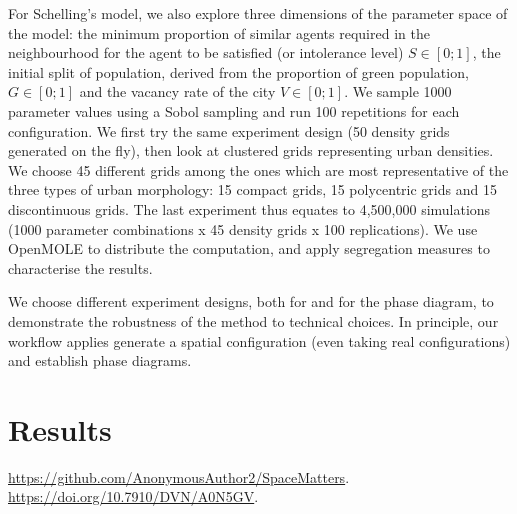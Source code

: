 \documentclass[preprint,5p,times,twocolumn,authoryear]{elsarticle}
\begin{document}
For Schelling's model, we also explore three dimensions of the parameter space of the model: the minimum proportion of similar agents required in the neighbourhood for the agent to be satisfied (or intolerance level) $S\in \left[0;1\right]$, the initial split of population, derived from the proportion of green population, $G\in \left[0;1\right]$ and the vacancy rate of the city $V\in \left[0;1\right]$. We sample 1000 parameter values using a Sobol sampling and run 100 repetitions for each configuration. We first try the same experiment design (50 density grids generated on the fly), then look at clustered grids representing urban densities. We choose 45 different grids among the ones which are most representative of the three types of urban morphology: 15 compact grids, 15 polycentric grids and 15 discontinuous grids. The last experiment thus equates to 4,500,000 simulations (1000 parameter combinations x 45 density grids x 100 replications). We use OpenMOLE to distribute the computation, and apply segregation measures to characterise the results.



We choose different experiment designs, both for  and for the phase diagram, to demonstrate the robustness of the method to technical choices. In principle, our workflow applies generate a spatial configuration (even taking real configurations) and  establish phase diagrams.




\section{Results}


 \url{https://github.com/AnonymousAuthor2/SpaceMatters}. \url{https://doi.org/10.7910/DVN/A0N5GV}.
\end{document}
